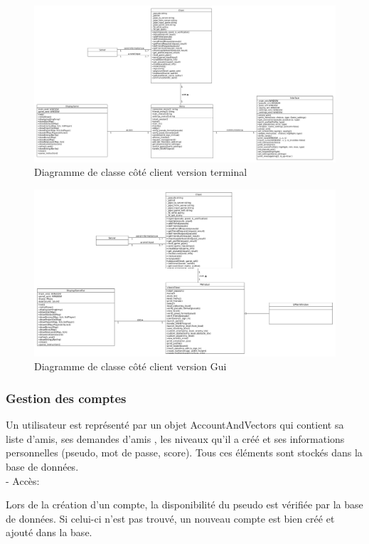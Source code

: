 \documentclass[a4paper,12pt]{article}
\begin{document}
\begin{figure}
\centering
\includegraphics[scale=0.3, angle=90]{images/newClientClassDiagram.jpg}
\caption{Diagramme de classe côté client version terminal}
\end{figure}
\begin{figure}
\centering
\includegraphics[scale=0.3, angle=90]{images/newClientGUIClassDiagram.png}
\caption{Diagramme de classe côté client version Gui}
\end{figure}
\newpage


\subsubsection{Gestion des comptes}
Un utilisateur est représenté  par un objet AccountAndVectors
qui contient sa liste d'amis, ses demandes d'amis , les niveaux qu'il a créé et ses informations personnelles (pseudo, mot de passe, score). Tous ces éléments sont stockés dans la base de données.\\

- Accès:

Lors de la création d'un compte, la disponibilité du pseudo est vérifiée par la base de données. Si celui-ci n'est pas trouvé, un nouveau compte est bien créé et ajouté dans la base.
\end{document}
